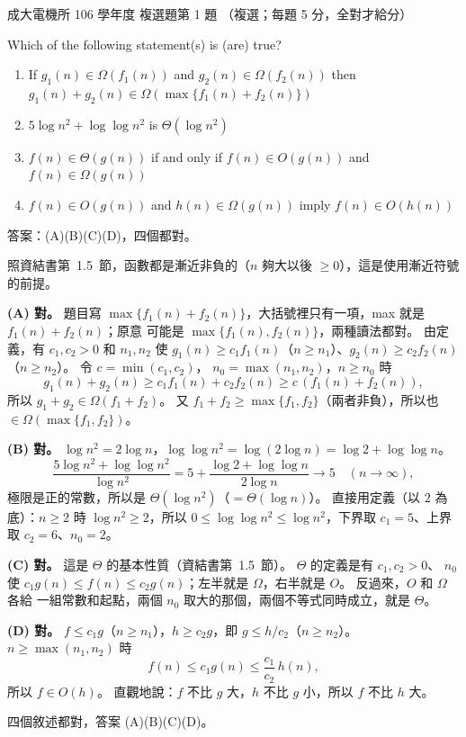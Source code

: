 \begin{pastexam}[label={px:ncku-106-ee-ds-01}]{成大電機所 106 學年度 複選題第 1 題}
（複選；每題 5 分，全對才給分）

Which of the following statement(s) is (are) true?
\begin{enumerate}[label=(\Alph*)]
\item If $g_1(n) \in \Omega(f_1(n))$ and $g_2(n) \in \Omega(f_2(n))$ then $g_1(n)+g_2(n) \in \Omega(\max\{f_1(n)+f_2(n)\})$
\item $5\log n^2 + \log\log n^2$ is $\Theta(\log n^2)$
\item $f(n) \in \Theta(g(n))$ if and only if $f(n) \in O(g(n))$ and $f(n) \in \Omega(g(n))$
\item $f(n) \in O(g(n))$ and $h(n) \in \Omega(g(n))$ imply $f(n) \in O(h(n))$
\end{enumerate}
\end{pastexam}

\begin{pastsoln}
答案：(A)(B)(C)(D)，四個都對。

照資結書第~1.5~節，函數都是漸近非負的（$n$ 夠大以後 $\ge 0$），這是使用漸近符號的前提。

\textbf{(A) 對。} 題目寫 $\max\{f_1(n) + f_2(n)\}$，大括號裡只有一項，max 就是 $f_1(n) + f_2(n)$；原意
可能是 $\max\{f_1(n), f_2(n)\}$，兩種讀法都對。 由定義，有 $c_1, c_2 > 0$ 和 $n_1, n_2$ 使
$g_1(n) \ge c_1 f_1(n)$（$n \ge n_1$）、$g_2(n) \ge c_2 f_2(n)$（$n \ge n_2$）。 令 $c = \min(c_1, c_2)$，
$n_0 = \max(n_1, n_2)$，$n \ge n_0$ 時
\[
g_1(n) + g_2(n) \ge c_1 f_1(n) + c_2 f_2(n) \ge c\,(f_1(n) + f_2(n)),
\]
所以 $g_1 + g_2 \in \Omega(f_1 + f_2)$。 又 $f_1 + f_2 \ge \max\{f_1, f_2\}$（兩者非負），所以也
$\in \Omega(\max\{f_1, f_2\})$。

\textbf{(B) 對。} $\log n^2 = 2\log n$，$\log\log n^2 = \log(2\log n) = \log 2 + \log\log n$。
\[
\frac{5\log n^2 + \log\log n^2}{\log n^2} = 5 + \frac{\log 2 + \log\log n}{2\log n} \to 5 \quad (n \to \infty),
\]
極限是正的常數，所以是 $\Theta(\log n^2)$（$= \Theta(\log n)$）。 直接用定義（以 $2$ 為底）：$n \ge 2$ 時 $\log n^2 \ge 2$，所以
$0 \le \log\log n^2 \le \log n^2$，下界取 $c_1 = 5$、上界取 $c_2 = 6$、$n_0 = 2$。

\textbf{(C) 對。} 這是 $\Theta$ 的基本性質（資結書第~1.5~節）。 $\Theta$ 的定義是有 $c_1, c_2 > 0$、
$n_0$ 使 $c_1 g(n) \le f(n) \le c_2 g(n)$；左半就是 $\Omega$，右半就是 $O$。 反過來，$O$ 和 $\Omega$ 各給
一組常數和起點，兩個 $n_0$ 取大的那個，兩個不等式同時成立，就是 $\Theta$。

\textbf{(D) 對。} $f \le c_1 g$（$n \ge n_1$），$h \ge c_2 g$，即 $g \le h / c_2$（$n \ge n_2$）。 $n \ge \max(n_1, n_2)$ 時
\[
f(n) \le c_1 g(n) \le \frac{c_1}{c_2}\, h(n),
\]
所以 $f \in O(h)$。 直觀地說：$f$ 不比 $g$ 大，$h$ 不比 $g$ 小，所以 $f$ 不比 $h$ 大。

四個敘述都對，答案 (A)(B)(C)(D)。
\end{pastsoln}
